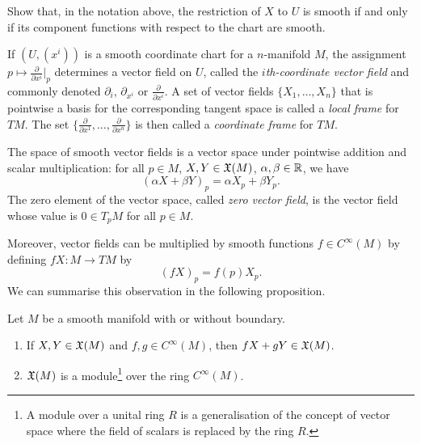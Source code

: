\begin{exercise}\label{ex:vfcomponents}
	Show that, in the notation above, the restriction of $X$ to $U$ is smooth if and only if its component functions with respect to the chart are smooth.
\end{exercise}

\begin{example}
	If $(U, (x^i))$ is a smooth coordinate chart for a $n$-manifold $M$, the assignment $p \mapsto \frac{\partial}{\partial x^i}\big|_p$ determines a vector field on $U$, called the \emph{$i$th-coordinate vector field} and commonly denoted $\partial_{i}$, $\partial_{x^i}$ or $\frac{\partial}{\partial x^i}$.
	A set of vector fields $\{X_1, \ldots, X_n\}$ that is pointwise a basis for the corresponding tangent space is called a \emph{local frame} for $TM$.
	The set $\{\frac{\partial}{\partial x^1}, \ldots, \frac{\partial}{\partial x^n}\}$ is then called a \emph{coordinate frame} for $TM$.
\end{example}

The space of smooth vector fields is a vector space under pointwise addition and scalar multiplication: for all $p\in M$, $X,Y\in\mathfrak{X}(M)$, $\alpha, \beta \in \mathbb{R}$, we have
\begin{equation}
	(\alpha X + \beta Y)_p = \alpha X_p + \beta Y_p.
\end{equation}
The zero element of the vector space, called \emph{zero vector field}, is the vector field whose value is $0\in T_pM$ for all $p\in M$.

Moreover, vector fields can be multiplied by smooth functions $f\in C^\infty(M)$ by defining $fX:M\to  TM$ by
\begin{equation}
	(fX)_p = f(p)X_p.
\end{equation}
We can summarise this observation in the following proposition.

\begin{proposition}
	Let $M$ be a smooth manifold with or without boundary.
	\begin{enumerate}
		\item If $X,Y \in \mathfrak{X}(M)$ and $f,g\in C^\infty(M)$, then $fX+gY \in\mathfrak{X}(M)$.
		\item $\mathfrak{X}(M)$ is a module\footnote{A module over a unital ring $R$ is a generalisation of the concept of vector space where the field of scalars is replaced by the ring $R$.} over the ring $C^\infty(M)$.
	\end{enumerate}
\end{proposition}

